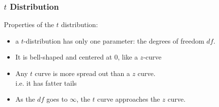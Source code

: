 \documentclass[slides]{beamer}
\newcommand{\blue}[1]{\textcolor{blue2}{#1}}
\newcommand{\xbar}{\overline{x}}
\begin{document}
%
%
%
%
%



\begin{frame}
\frametitle{$t$ Distribution}
Properties of the $t$ distribution:

\begin{itemize}
\item a $t$-distribution has only one parameter: the \blue{degrees of freedom} $df$.
\pause \item It is bell-shaped and centered at 0, like a $z$-curve
\pause \item Any $t$ curve is more spread out than a $z$ curve.\\
i.e. it has \blue{fatter tails}
\pause \item As the $df$ goes to $\infty$, the $t$ curve approaches the $z$ curve.
\end{itemize}

\end{frame}
\end{document}
